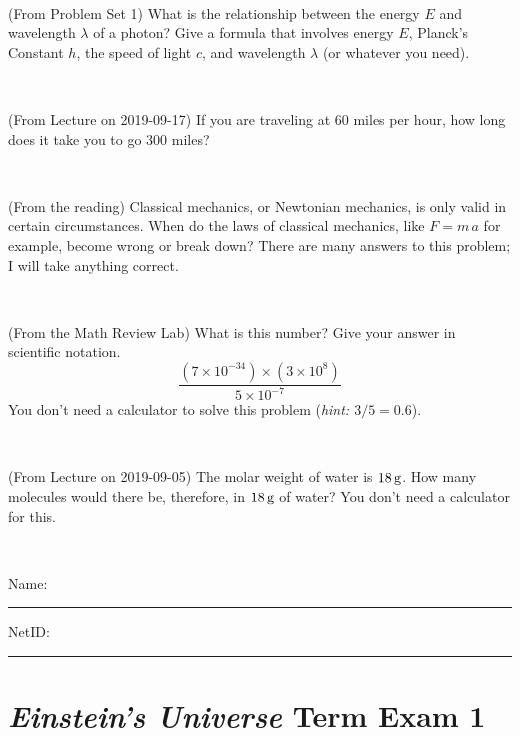 \documentclass[12pt, letterpaper]{article}
\begin{document}
\vfill ~

\begin{problem} (From Problem Set 1)
What is the relationship between the energy $E$ and wavelength
$\lambda$ of a photon? Give a formula that involves energy $E$,
Planck's Constant $h$, the speed of light $c$, and wavelength
$\lambda$ (or whatever you need).
\end{problem}

\vfill ~


\clearpage


\begin{problem} (From Lecture on 2019-09-17)
If you are traveling at 60 miles per hour, how long does
it take you to go 300 miles?
\end{problem}


\vfill ~

\begin{problem} (From the reading)
Classical mechanics, or Newtonian mechanics, is only valid in certain
circumstances. When do the laws of classical mechanics, like $F =
m\,a$ for example, become wrong or break down? There are many answers
to this problem; I will take anything correct.
\end{problem}


\vfill ~

\begin{problem} (From the Math Review Lab)
What is this number? Give your answer in scientific notation.
$$
\frac{(7\times10^{-34})\times(3\times10^8)}{5\times10^{-7}}
$$
You don't need a calculator to solve this problem (\textit{hint: $3/5=0.6$}).
\end{problem}


\vfill ~

\begin{problem} (From Lecture on 2019-09-05)
The molar weight of water is $18\,\mathrm{g}$. How many molecules would there
be, therefore, in $18\,\mathrm{g}$ of water? You don't need a calculator for
this.
\end{problem}


\vfill ~


\cleardoublepage



\noindent
Name: \rule[-1ex]{0.60\textwidth}{0.1pt}
NetID: \rule[-1ex]{0.20\textwidth}{0.1pt}

\section*{\textsl{Einstein's Universe} Term Exam 1}
\setcounter{problem}{1}
\end{document}
